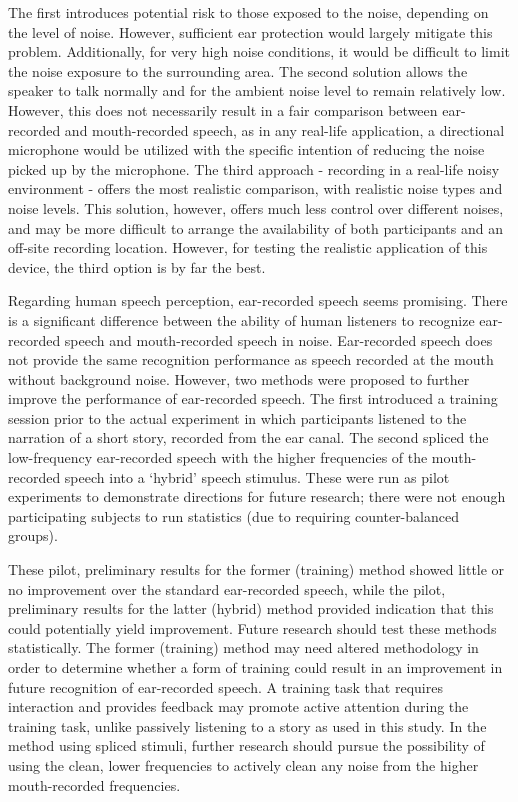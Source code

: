 The first introduces potential risk to those exposed to the noise, depending on the level of noise.  However, sufficient ear protection would largely mitigate this problem.  Additionally, for very high noise conditions, it would be difficult to limit the noise exposure to the surrounding area.  The second solution allows the speaker to talk normally and for the ambient noise level to remain relatively low.  However, this does not necessarily result in a fair comparison between ear-recorded and mouth-recorded speech, as in any real-life application, a directional microphone would be utilized with the specific intention of reducing the noise picked up by the microphone.  %
The third approach - recording in a real-life noisy environment - offers the most realistic comparison, with realistic noise types and noise levels.  This solution, however, offers much less control over different noises, and may be more difficult to arrange the availability of both participants and an off-site recording location.  However, for testing the realistic application of this device, the third option is by far the best.

Regarding human speech perception, ear-recorded speech seems promising.  There is a significant difference between the ability of human listeners to recognize ear-recorded speech and mouth-recorded speech in noise.  Ear-recorded speech does not provide the same recognition performance as speech recorded at the mouth without background noise.  However, two methods were proposed to further improve the performance of ear-recorded speech.  The first introduced a training session prior to the actual experiment in which participants listened to the narration of a short story, recorded from the ear canal.  The second spliced the low-frequency ear-recorded speech with the higher frequencies of the mouth-recorded speech into a `hybrid' speech stimulus.  These were run as pilot experiments to demonstrate directions for future research; there were not enough participating subjects to run statistics (due to requiring counter-balanced groups).  

These pilot, preliminary results for the former (training) method showed little or no improvement over the standard ear-recorded speech, while the pilot, preliminary results for the latter (hybrid) method provided indication that this could potentially yield improvement.  Future research should test these methods statistically.  The former (training) method may need altered methodology in order to determine whether a form of training could result in an improvement in future recognition of ear-recorded speech.  A training task that requires interaction and provides feedback may promote active attention during the training task, unlike passively listening to a story as used in this study.  In the method using spliced stimuli, further research should pursue the possibility of using the clean, lower frequencies to actively clean any noise from the higher mouth-recorded frequencies.  


